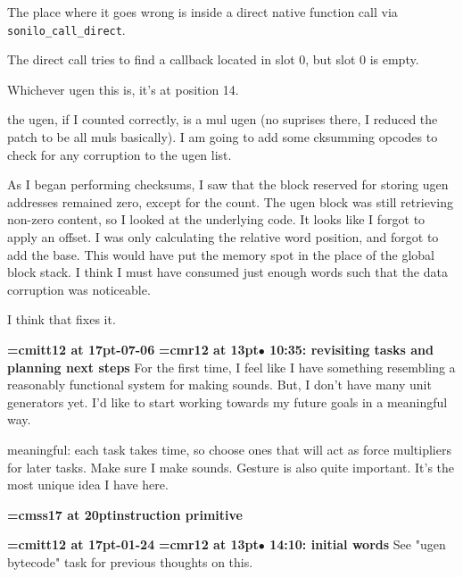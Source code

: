 The place where it goes wrong is inside a direct native function call via {\tt sonilo\_call\_direct}.
\par

The direct call tries to find a callback located in slot 0, but slot 0 is empty.
\par

Whichever ugen this is, it's at position 14.
\par

the ugen, if I counted correctly, is a mul ugen (no suprises there, I reduced the patch to be all muls basically). I am going to add some cksumming opcodes to check for any corruption to the ugen list.
\par

As I began performing checksums, I saw that the block reserved for storing ugen addresses remained zero, except for the count. The ugen block was still retrieving non-zero content, so I looked at the underlying code. It looks like I forgot to apply an offset. I was only calculating the relative word position, and forgot to add the base. This would have put the memory spot in the place of the global block stack. I think I must have consumed just enough words such that the data corruption was noticeable.
\par

I think that fixes it.
\par

{\medskip\noindent\bf\font\titlefont=cmitt12 at 17pt-07-06}\medskip
{\smallskip\noindent\bf\font\titlefont=cmr12 at 13pt\titlefont $\bullet$ 10:35: revisiting tasks and planning next steps}\smallskip
For the first time, I feel like I have something resembling a reasonably functional system for making sounds. But, I don't have many unit generators yet. I'd like to start working towards my future goals in a meaningful way.
\par

meaningful: each task takes time, so choose ones that will act as force multipliers for later tasks. Make sure I make sounds. Gesture is also quite important. It's the most unique idea I have here.
\par

{\medskip\noindent\bf\font\titlefont=cmss17 at 20pt\titlefont instruction primitive}\medskip

{\medskip\noindent\bf\font\titlefont=cmitt12 at 17pt-01-24}\medskip
{\smallskip\noindent\bf\font\titlefont=cmr12 at 13pt\titlefont $\bullet$ 14:10: initial words}\smallskip
See "ugen bytecode" task for previous thoughts on this.
\par

